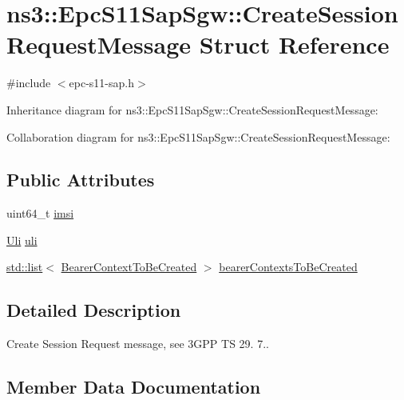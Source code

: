 \hypertarget{structns3_1_1EpcS11SapSgw_1_1CreateSessionRequestMessage}{}\section{ns3\+:\+:Epc\+S11\+Sap\+Sgw\+:\+:Create\+Session\+Request\+Message Struct Reference}
\label{structns3_1_1EpcS11SapSgw_1_1CreateSessionRequestMessage}


{\ttfamily \#include $<$epc-\/s11-\/sap.\+h$>$}



Inheritance diagram for ns3\+:\+:Epc\+S11\+Sap\+Sgw\+:\+:Create\+Session\+Request\+Message\+:


Collaboration diagram for ns3\+:\+:Epc\+S11\+Sap\+Sgw\+:\+:Create\+Session\+Request\+Message\+:
\subsection*{Public Attributes}
\begin{DoxyCompactItemize}
\item 
uint64\+\_\+t \hyperlink{structns3_1_1EpcS11SapSgw_1_1CreateSessionRequestMessage_a58c76624dd25836d24cb6feffa671272}{imsi}
\item 
\hyperlink{structns3_1_1EpcS11Sap_1_1Uli}{Uli} \hyperlink{structns3_1_1EpcS11SapSgw_1_1CreateSessionRequestMessage_ae1ad7aa455c7f31380c770a857109f02}{uli}
\item 
\hyperlink{openflow-interface_8h_afd9bcfa176617760671b67580f536fa7}{std\+::list}$<$ \hyperlink{structns3_1_1EpcS11SapSgw_1_1BearerContextToBeCreated}{Bearer\+Context\+To\+Be\+Created} $>$ \hyperlink{structns3_1_1EpcS11SapSgw_1_1CreateSessionRequestMessage_a287e300d4791a02c3bf6c49d0a10da25}{bearer\+Contexts\+To\+Be\+Created}
\end{DoxyCompactItemize}


\subsection{Detailed Description}
Create Session Request message, see 3\+G\+PP TS 29. 7.. 

\subsection{Member Data Documentation}
